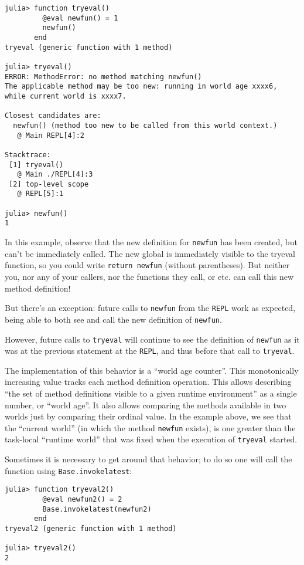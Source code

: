 \documentclass[
]{article}
\begin{document}
\begin{verbatim}
julia> function tryeval()
         @eval newfun() = 1
         newfun()
       end
tryeval (generic function with 1 method)

julia> tryeval()
ERROR: MethodError: no method matching newfun()
The applicable method may be too new: running in world age xxxx6, while current world is xxxx7.

Closest candidates are:
  newfun() (method too new to be called from this world context.)
   @ Main REPL[4]:2

Stacktrace:
 [1] tryeval()
   @ Main ./REPL[4]:3
 [2] top-level scope
   @ REPL[5]:1

julia> newfun()
1
\end{verbatim}

In this example, observe that the new definition for \texttt{newfun} has
been created, but can't be immediately called. The new global is
immediately visible to the tryeval function, so you could write
\texttt{return\ newfun} (without parentheses). But neither you, nor any
of your callers, nor the functions they call, or etc. can call this new
method definition!

But there's an exception: future calls to \texttt{newfun} from the
\texttt{REPL} work as expected, being able to both see and call the new
definition of \texttt{newfun}.

However, future calls to \texttt{tryeval} will continue to see the
definition of \texttt{newfun} as it was at the previous statement at the
\texttt{REPL}, and thus before that call to \texttt{tryeval}.

The implementation of this behavior is a ``world age counter''. This
monotonically increasing value tracks each method definition operation.
This allows describing ``the set of method definitions visible to a
given runtime environment'' as a single number, or ``world age''. It
also allows comparing the methods available in two worlds just by
comparing their ordinal value. In the example above, we see that the
``current world'' (in which the method \texttt{newfun} exists), is one
greater than the task-local ``runtime world'' that was fixed when the
execution of \texttt{tryeval} started.

Sometimes it is necessary to get around that behavior; to do so one will
call the function using \texttt{Base.invokelatest}:

\begin{verbatim}
julia> function tryeval2()
         @eval newfun2() = 2
         Base.invokelatest(newfun2)
       end
tryeval2 (generic function with 1 method)

julia> tryeval2()
2
\end{verbatim}
\end{document}
